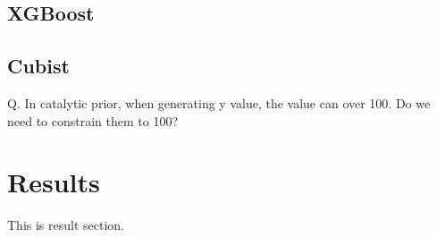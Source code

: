 \documentclass[sn-basic,pdflatex]{sn-jnl}
\theoremstyle{remark}
\theoremstyle{definition}
\begin{document}
\subsection{XGBoost}\label{subsec3-4}

\subsection{Cubist}\label{subsec3-5}

Q. In catalytic prior, when generating y value, the value can over 100.
Do we need to constrain them to 100?

\newpage

\section{Results}\label{sec4}

This is result section.
\end{document}

